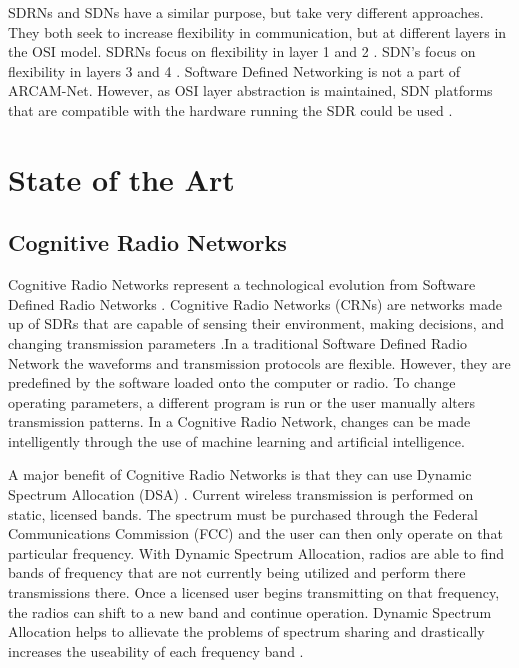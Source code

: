 SDRNs and SDNs have a similar purpose, but take very different approaches. They both seek to increase flexibility in communication, but at different layers in the OSI model. SDRNs focus on flexibility in layer 1 and 2 \cite{Akyildiz2007921}. SDN's focus on flexibility in layers 3 and 4 \cite{6994333}. Software Defined Networking is not a part of ARCAM-Net. However, as OSI layer abstraction is maintained, SDN platforms that are compatible with the hardware running the SDR could be used \cite{6933795}. 




\section{State of the Art}


\subsection{Cognitive Radio Networks}

Cognitive Radio Networks represent a technological evolution from Software Defined Radio Networks \cite{6599059}. Cognitive Radio Networks (CRNs) are networks made up of SDRs that are capable of sensing their environment, making decisions, and changing transmission parameters \cite{Akyildiz2007921}.In a traditional Software Defined Radio Network the waveforms and transmission protocols are flexible. However, they are predefined by the software loaded onto the computer or radio. To change operating parameters, a different program is run or the user manually alters transmission patterns. In a Cognitive Radio Network, changes can be made intelligently through the use of machine learning and artificial intelligence. 

A major benefit of Cognitive Radio Networks is that they can use Dynamic Spectrum Allocation (DSA) \cite{6892537}. Current wireless transmission is performed on static, licensed bands. The spectrum must be purchased through the Federal Communications Commission (FCC) and the user can then only operate on that particular frequency. With Dynamic Spectrum Allocation, radios are able to find bands of frequency that are not currently being utilized and perform there transmissions there. Once a licensed user begins transmitting on that frequency, the radios can shift to a new band and continue operation. Dynamic Spectrum Allocation helps to allievate the problems of spectrum sharing and drastically increases the useability of each frequency band \cite{6599059}. 


